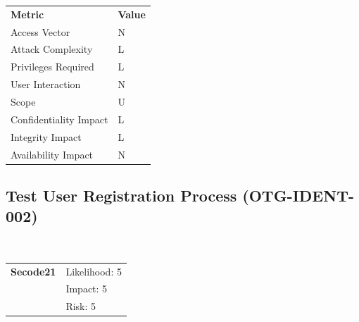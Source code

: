 \documentclass[headsepline,footsepline,footinclude=false,oneside,fontsize=11pt,paper=a4,listof=totoc,bibliography=totoc]{scrbook} %
\begin{document}
\begin{center}
	\begin{tabular}{ll}
		\rowcolor[HTML]{34CDF9}
		{\color[HTML]{ECF4FF} \textbf{Metric}}        & {\color[HTML]{ECF4FF} \textbf{Value}} \\
		\rowcolor[HTML]{BBDAFF}
		{\color[HTML]{333333} Access Vector}          & {\color[HTML]{333333} } N              \\
		\rowcolor[HTML]{ECF4FF}
		{\color[HTML]{333333} Attack Complexity}      & {\color[HTML]{333333} } L              \\
		\rowcolor[HTML]{BBDAFF}
		{\color[HTML]{333333} Privileges Required}    & {\color[HTML]{333333} } L              \\
		\rowcolor[HTML]{ECF4FF}
		{\color[HTML]{333333} User Interaction}       & {\color[HTML]{333333} } N              \\
		\rowcolor[HTML]{BBDAFF}
		{\color[HTML]{333333} Scope}                  & {\color[HTML]{333333} } U              \\
		\rowcolor[HTML]{ECF4FF}
		{\color[HTML]{333333} Confidentiality Impact} & {\color[HTML]{333333} } L              \\
		\rowcolor[HTML]{BBDAFF}
		{\color[HTML]{333333} Integrity Impact}       & {\color[HTML]{333333} } L              \\
		\rowcolor[HTML]{ECF4FF}
		{\color[HTML]{333333} Availability Impact}    & {\color[HTML]{333333} } N
	\end{tabular}
\end{center}
\pagebreak

\subsection{Test User Registration Process (OTG-IDENT-002)}\
\begin{tabular}{cR{12cm}}
	\textbf{Secode21} & Likelihood: 5\\& Impact: 5\\& Risk: 5
\end{tabular}
\end{document}

